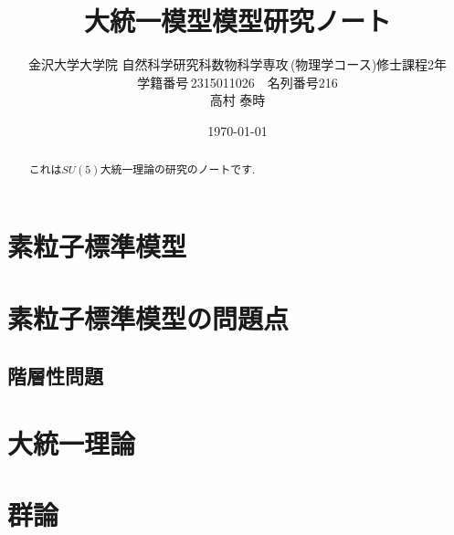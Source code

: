 \documentclass[uplatex,dvipdfmx,a4paper,titlepage]{jsbook}
\theoremstyle{plain}
\theoremstyle{definition}
\begin{document}
\title{大統一模型模型研究ノート}
\author{金沢大学大学院\,\,自然科学研究科数物科学専攻\,(物理学コース)修士課程2年\\学籍番号\,2315011026$\quad$名列番号216\\高村 泰時} 
\date{\today}
\maketitle

\tableofcontents
\clearpage

\begin{abstract}
  これは$SU(5)$大統一理論の研究のノートです.
\end{abstract}

\chapter{素粒子標準模型}


\chapter{素粒子標準模型の問題点}


\section{階層性問題}


\chapter{大統一理論}


\chapter{群論}





\end{document}

